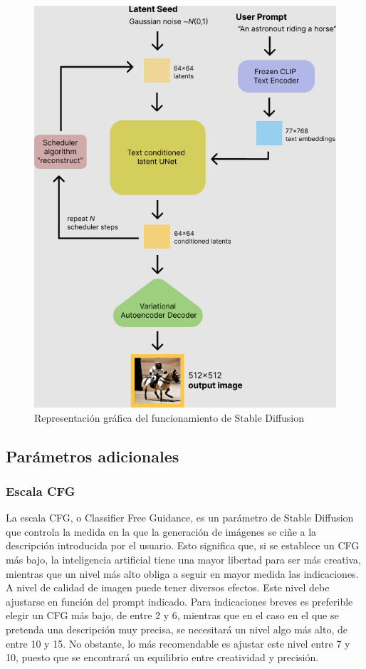 \begin{figure}[h]
	\centering
	\includegraphics[width = 0.4
	\textwidth]{Imagenes/Vectorial/representacionvisualSD.png}
	\caption{Representación gráfica del funcionamiento de Stable Diffusion}
	\label{fig:sd}
\end{figure}


\subsection{Parámetros adicionales}

\subsubsection{Escala CFG}

La escala CFG, o Classifier Free Guidance, es un parámetro de Stable Diffusion que controla la medida en la que la generación de imágenes se ciñe a la descripción introducida por el usuario. Esto significa que, si se establece un CFG más bajo, la inteligencia artificial tiene una mayor libertad para ser más creativa, mientras que un nivel más alto obliga a seguir en mayor medida las indicaciones.\\

A nivel de calidad de imagen puede tener diversos efectos. Este nivel debe ajustarse en función del prompt indicado. Para indicaciones breves es preferible elegir un CFG más bajo, de entre 2 y 6, mientras que en el caso en el que se pretenda una descripción muy precisa, se necesitará un nivel algo más alto, de entre 10 y 15. No obstante, lo más recomendable es ajustar este nivel entre 7 y 10, puesto que se encontrará un equilibrio entre creatividad y precisión.\\

